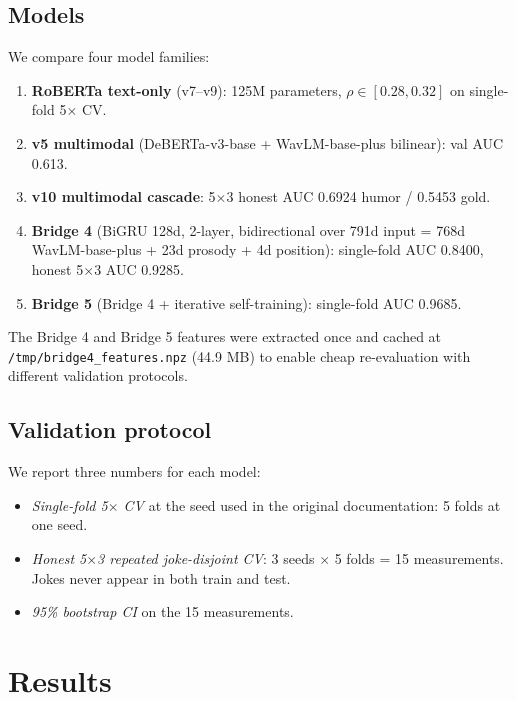 \documentclass[11pt, letterpaper]{article}
\begin{document}
\subsection{Models}

We compare four model families:
\begin{enumerate}
\item \textbf{RoBERTa text-only} (v7--v9): 125M parameters, $\rho \in [0.28, 0.32]$ on single-fold 5$\times$ CV.
\item \textbf{v5 multimodal} (DeBERTa-v3-base + WavLM-base-plus bilinear): val AUC 0.613.
\item \textbf{v10 multimodal cascade}: 5$\times$3 honest AUC 0.6924 humor / 0.5453 gold.
\item \textbf{Bridge 4} (BiGRU 128d, 2-layer, bidirectional over 791d input = 768d WavLM-base-plus + 23d prosody + 4d position): single-fold AUC 0.8400, honest 5$\times$3 AUC 0.9285.
\item \textbf{Bridge 5} (Bridge 4 + iterative self-training): single-fold AUC 0.9685.
\end{enumerate}

The Bridge 4 and Bridge 5 features were extracted once and cached at \texttt{/tmp/bridge4\_features.npz} (44.9 MB) to enable cheap re-evaluation with different validation protocols.

\subsection{Validation protocol}

We report three numbers for each model:
\begin{itemize}
\item \emph{Single-fold 5$\times$ CV} at the seed used in the original documentation: 5 folds at one seed.
\item \emph{Honest 5$\times$3 repeated joke-disjoint CV}: 3 seeds $\times$ 5 folds = 15 measurements. Jokes never appear in both train and test.
\item \emph{95\% bootstrap CI} on the 15 measurements.
\end{itemize}

\section{Results}
\end{document}
